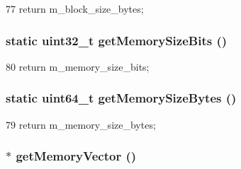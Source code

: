 \begin{DoxyCode}
77 { return m_block_size_bytes; }
\end{DoxyCode}
\hypertarget{classRubySystem_a30259c41e1b009b45c094bccf585dab3}{
\subsubsection[{getMemorySizeBits}]{\setlength{\rightskip}{0pt plus 5cm}static {\bf uint32\_\-t} getMemorySizeBits ()}}
\label{classRubySystem_a30259c41e1b009b45c094bccf585dab3}



\begin{DoxyCode}
80 { return m_memory_size_bits; }
\end{DoxyCode}
\hypertarget{classRubySystem_a736ae287325afa244eda540419cdd90c}{
\subsubsection[{getMemorySizeBytes}]{\setlength{\rightskip}{0pt plus 5cm}static uint64\_\-t getMemorySizeBytes ()}}
\label{classRubySystem_a736ae287325afa244eda540419cdd90c}



\begin{DoxyCode}
79 { return m_memory_size_bytes; }
\end{DoxyCode}
\hypertarget{classRubySystem_aae1baebbd770dbbcf63259f5053681ea}{
\subsubsection[{getMemoryVector}]{$\ast$ getMemoryVector ()}}
\label{classRubySystem_aae1baebbd770dbbcf63259f5053681ea}



